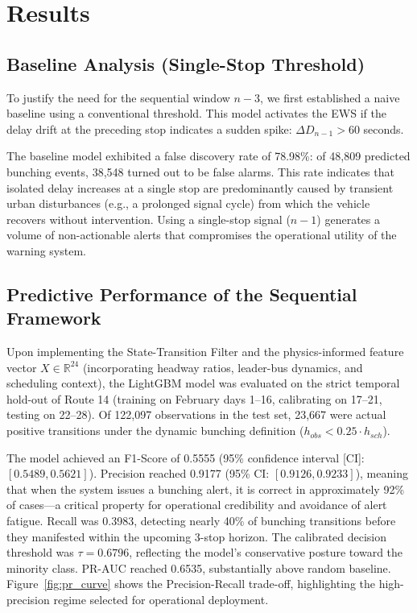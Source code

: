 \documentclass[fleqn,10pt,lineno]{wlpeerj}
\begin{document}
\section{Results}
\label{sec:results}

\subsection{Baseline Analysis (Single-Stop Threshold)}

To justify the need for the sequential window $n{-}3$, we first established a naive baseline
using a conventional threshold. This model activates the EWS if the delay drift at the
preceding stop indicates a sudden spike: $\Delta D_{n-1} > 60$ seconds.

The baseline model exhibited a false discovery rate of 78.98\%: of 48{,}809 predicted bunching
events, 38{,}548 turned out to be false alarms. This rate indicates that isolated delay
increases at a single stop are predominantly caused by transient urban disturbances (e.g., a
prolonged signal cycle) from which the vehicle recovers without intervention. Using a
single-stop signal ($n{-}1$) generates a volume of non-actionable alerts that compromises the
operational utility of the warning system.

\subsection{Predictive Performance of the Sequential Framework}

Upon implementing the State-Transition Filter and the physics-informed feature vector $X \in \mathbb{R}^{24}$ (incorporating headway ratios, leader-bus dynamics, and scheduling context), the
LightGBM model was evaluated on the strict temporal hold-out of
Route 14 (training on February days 1--16, calibrating on 17--21, testing on 22--28). Of 122,097 observations in the test set, 23,667 were actual positive transitions under the dynamic bunching definition ($h_{obs} < 0.25 \cdot h_{sch}$).

The model achieved an F1-Score of 0.5555 (95\% confidence interval
[CI]: $[0.5489, 0.5621]$). Precision reached 0.9177 (95\% CI:
$[0.9126, 0.9233]$), meaning that when the system issues a bunching alert, it is correct in approximately 92\% of cases---a critical property for operational credibility and avoidance of alert fatigue. Recall
was 0.3983, detecting nearly 40\% of bunching transitions before they manifested within the upcoming 3-stop horizon. The calibrated decision threshold was $\tau = 0.6796$, reflecting the model's conservative posture toward the minority class. PR-AUC reached 0.6535, substantially above random baseline. Figure~\ref{fig:pr_curve} shows the Precision-Recall trade-off, highlighting the high-precision regime selected for operational deployment.
\end{document}
